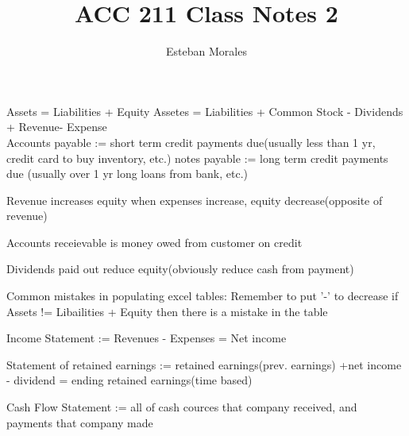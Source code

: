 \documentclass[12pt]{article}
\newenvironment{statement}[2][Section:]{\begin{trivlist}
\item[\hskip \labelsep {\bfseries #1}\hskip \labelsep {\bfseries #2.}]}{\end{trivlist}}
\begin{document}
 
%
%
 
\title{ACC 211 Class Notes 2} %
\author{Esteban Morales} %
\maketitle


\begin{statement}{Equation of accounting} %
Assets = Liabilities + Equity
Assetes = Liabilities + Common Stock - Dividends + Revenue- Expense\\
Accounts payable := short term credit payments due(usually less than 1 yr, credit card to buy inventory, etc.)
notes payable := long term credit payments due (usually over 1 yr long loans from bank, etc.)

Revenue increases equity
when expenses increase, equity decrease(opposite of revenue)

Accounts receievable is money owed from customer on credit

Dividends paid out reduce equity(obviously reduce cash from payment)


Common mistakes in populating excel tables: Remember to put '-' to decrease
if Assets != Libailities + Equity then there is a mistake in the table
\end{statement}
 

\begin{statement}{income Statement, statement of retained earnings and balance sheet}

Income Statement := Revenues - Expenses = Net income

Statement of retained earnings := retained earnings(prev. earnings) +net income - dividend = ending retained earnings(time based)

Cash Flow Statement := all of cash cources that company received, and payments that company made





\end{statement}
 
\end{document}
